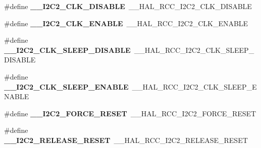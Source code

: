 \begin{DoxyCompactItemize}
\item 
\hypertarget{group___h_a_l___r_c_c___aliased_ga4035dd0ee6f7b6386fd8531181786c97}{\#define {\bfseries \-\_\-\-\_\-\-I2\-C2\-\_\-\-C\-L\-K\-\_\-\-D\-I\-S\-A\-B\-L\-E}~\-\_\-\-\_\-\-H\-A\-L\-\_\-\-R\-C\-C\-\_\-\-I2\-C2\-\_\-\-C\-L\-K\-\_\-\-D\-I\-S\-A\-B\-L\-E}\label{group___h_a_l___r_c_c___aliased_ga4035dd0ee6f7b6386fd8531181786c97}

\item 
\hypertarget{group___h_a_l___r_c_c___aliased_ga5cef079b7e35da960f9871a7d1ed1816}{\#define {\bfseries \-\_\-\-\_\-\-I2\-C2\-\_\-\-C\-L\-K\-\_\-\-E\-N\-A\-B\-L\-E}~\-\_\-\-\_\-\-H\-A\-L\-\_\-\-R\-C\-C\-\_\-\-I2\-C2\-\_\-\-C\-L\-K\-\_\-\-E\-N\-A\-B\-L\-E}\label{group___h_a_l___r_c_c___aliased_ga5cef079b7e35da960f9871a7d1ed1816}

\item 
\hypertarget{group___h_a_l___r_c_c___aliased_ga9433bf9082b7128475bf4a4073bcdca1}{\#define {\bfseries \-\_\-\-\_\-\-I2\-C2\-\_\-\-C\-L\-K\-\_\-\-S\-L\-E\-E\-P\-\_\-\-D\-I\-S\-A\-B\-L\-E}~\-\_\-\-\_\-\-H\-A\-L\-\_\-\-R\-C\-C\-\_\-\-I2\-C2\-\_\-\-C\-L\-K\-\_\-\-S\-L\-E\-E\-P\-\_\-\-D\-I\-S\-A\-B\-L\-E}\label{group___h_a_l___r_c_c___aliased_ga9433bf9082b7128475bf4a4073bcdca1}

\item 
\hypertarget{group___h_a_l___r_c_c___aliased_ga64ad1beac30d497e381d374778b1a953}{\#define {\bfseries \-\_\-\-\_\-\-I2\-C2\-\_\-\-C\-L\-K\-\_\-\-S\-L\-E\-E\-P\-\_\-\-E\-N\-A\-B\-L\-E}~\-\_\-\-\_\-\-H\-A\-L\-\_\-\-R\-C\-C\-\_\-\-I2\-C2\-\_\-\-C\-L\-K\-\_\-\-S\-L\-E\-E\-P\-\_\-\-E\-N\-A\-B\-L\-E}\label{group___h_a_l___r_c_c___aliased_ga64ad1beac30d497e381d374778b1a953}

\item 
\hypertarget{group___h_a_l___r_c_c___aliased_ga07143f105327507321078f673940461d}{\#define {\bfseries \-\_\-\-\_\-\-I2\-C2\-\_\-\-F\-O\-R\-C\-E\-\_\-\-R\-E\-S\-E\-T}~\-\_\-\-\_\-\-H\-A\-L\-\_\-\-R\-C\-C\-\_\-\-I2\-C2\-\_\-\-F\-O\-R\-C\-E\-\_\-\-R\-E\-S\-E\-T}\label{group___h_a_l___r_c_c___aliased_ga07143f105327507321078f673940461d}

\item 
\hypertarget{group___h_a_l___r_c_c___aliased_gaf7a482f23ba23252ef88c00e86edde9a}{\#define {\bfseries \-\_\-\-\_\-\-I2\-C2\-\_\-\-R\-E\-L\-E\-A\-S\-E\-\_\-\-R\-E\-S\-E\-T}~\-\_\-\-\_\-\-H\-A\-L\-\_\-\-R\-C\-C\-\_\-\-I2\-C2\-\_\-\-R\-E\-L\-E\-A\-S\-E\-\_\-\-R\-E\-S\-E\-T}\label{group___h_a_l___r_c_c___aliased_gaf7a482f23ba23252ef88c00e86edde9a}


\end{DoxyCompactItemize}
